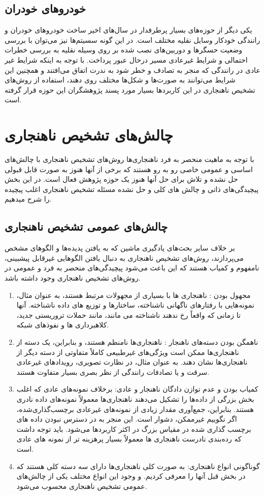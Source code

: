 \documentclass[12pt,a4paper]{report}
\begin{document}
\subsection{خودرو‌های خودران}
یکی دیگر از حوزه‌های بسیار پرطرفدار در سال‌های اخیر ساخت خودرو‌های خودران و رانندگی خودکار وسایل نقلیه مختلف است. در این گونه سسیتم‌ها نیز می‌توان با بررسی وضعیت حسگر‌ها و دوربین‌های نصب شده بر روی وسیله نقلیه به بررسی خطرات احتمالی و شرایط غیرعادی مسیر درحال عبور پرداخت. با توجه به اینکه شرایط غیر عادی در رانندگی که منجر به تصادف و خطر شود به ندرت اتفاق می‌افتند و همچنین این شرایط می‌توانند به صورت‌ها و شکل‌ها مختلف روی دهند، استفاده از روش‌های تشخیص ناهنجاری در این کاربردها بسیار مورد پسند پژوهشگران این حوزه قرار گرفته است.

\section{چالش‌‌های تشخیص ناهنجاری}
با توجه به ماهیت منحصر به فرد ناهنجاری‌ها روش‌های تشخیص ناهنجاری با چالش‌های اساسی و عمومی خاصی رو به رو هستند که برخی از آنها هنوز به صورت قابل قبولی حل نشده و تلاش برای حل آنها هنوز یک حوزه پژوهش فعال است. در این بخش پیچیدگی‌های ذاتی و چالش های کلی و حل نشده مسئله تشخیص ناهنجاری اغلب پیچیده را شرح میدهیم. 
\subsection{چالش‌های عمومی تشخیص ناهنجاری}
بر خلاف سایر بحث‌های یادگیری ماشین که به یافتن پدیده‌ها و الگوهای مشخص می‌پردازند، روش‌های تشخیص ناهنجاری به دنبال یافتن الگوهایی غیرقابل پیشبینی، نامفهوم و کمیاب هستند که این باعث می‌شود پیچیدگی‌های منحصر به فرد و عمومی در روش‌های تشخیص ناهنجاری وجود داشته باشد.
\begin{enumerate}
\item{مجهول بودن
:‌
ناهنجاری ها با بسیاری از مجهولات مرتبط هستند، به عنوان مثال، نمونه‌هایی با رفتارهای ناگهانی ناشناخته، ساختارها و توزیع های داده ناشناخته. آنها تا زمانی که واقعاً رخ ندهند ناشناخته می مانند، مانند حملات تروریستی جدید، کلاهبرداری ها و نفوذهای شبکه.
}
\item
{
ناهمگن بودن دسته‌های ناهنجار 
:
ناهنجاری‌ها نامنظم هستند، و بنابراین، یک دسته از ناهنجاری‌ها ممکن است ویژگی‌های غیرطبیعی کاملاً متفاوتی از دسته دیگر از ناهنجاری‌ها نشان دهند. به عنوان مثال، در نظارت تصویری، رویدادهای غیرعادی سرقت و یا تصادفات رانندگی از نظر بصری بسیار متفاوت هستند.
}

\item{
کمیاب بودن و عدم توازن دادگان ناهنجار و عادی:
برخلاف نمونه‌های عادی که اغلب بخش بزرگی از داده‌ها را تشکیل می‌دهند ناهنجاری‌ها معمولاً نمونه‌های داده نادری هستند. بنابراین، جمع‌آوری مقدار زیادی از نمونه‌های غیرعادی برچسب‌گذاری‌شده، اگر نگوییم غیرممکن، دشوار است. این منجر به در دسترس نبودن داده های برچسب گذاری شده در مقیاس بزرگ در اکثر کاربرد‌ها می‌شود. باید توجه داشت که  رده‌بندی نادرست ناهنجاری ها معمولاً بسیار پرهزینه تر از نمونه های عادی است.
}

\item{
گوناگونی انواع ناهنجاری:
به صورت کلی ناهنجاری‌ها دارای سه دسته کلی هستند که در بخش قبل آنها را معرفی کردیم. و وجود این انواع مختلف یکی از چالش‌های عمومی تشخیص ناهنجاری محسوب می‌شود.
}
\end{enumerate}
\end{document}
